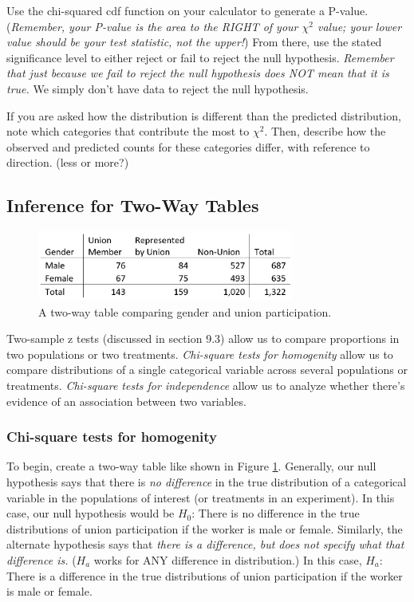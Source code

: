 \documentclass[12pt, a4paper]{article}
\theoremstyle{definition}
\begin{document}
Use the chi-squared cdf function on your calculator to generate a P-value.
(\textit{Remember, your P-value is the area to the RIGHT of your $\chi^2$ value; your lower value should be your test statistic, not the upper!})
From there, use the stated significance level to either reject or fail to reject the null hypothesis.
\textit{Remember that just because we fail to reject the null hypothesis does NOT mean that it is true.}
We simply don't have data to reject the null hypothesis.

If you are asked how the distribution is different than the predicted distribution, note which categories that contribute the most to $\chi^2$.
Then, describe how the observed and predicted counts for these categories differ, with reference to direction. (less or more?)

\subsection{Inference for Two-Way Tables}
\begin{figure}[t]
    \centering
    \includegraphics[width=0.75\textwidth]{chi-square-homogenity.png}
    \caption{A two-way table comparing gender and union participation.}
    \label{fig:chi-square-homo}
\end{figure}

Two-sample z tests (discussed in section 9.3) allow us to compare proportions in two populations or two treatments.
\textit{Chi-square tests for homogenity} allow us to compare distributions of a single categorical variable across several populations or treatments.
\textit{Chi-square tests for independence} allow us to analyze whether there's evidence of an association between two variables.

\subsubsection{Chi-square tests for homogenity}
To begin, create a two-way table like shown in Figure \ref{fig:chi-square-homo}.
Generally, our null hypothesis says that there is \textit{no difference} in the true distribution of a categorical variable in the populations of interest (or treatments in an experiment).
In this case, our null hypothesis would be $H_0$: There is no difference in the true distributions of union participation if the worker is male or female.
Similarly, the alternate hypothesis says that \textit{there is a difference, but does not specify what that difference is.} ($H_a$ works for ANY difference in distribution.)
In this case, $H_a$: There is a difference in the true distributions of union participation if the worker is male or female.
\end{document}
